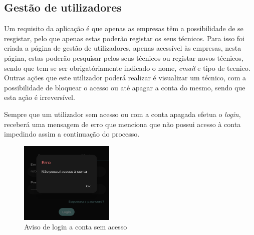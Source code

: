 \subsection{Gestão de utilizadores}
Um requisito da aplicação é que apenas as empresas têm a possibilidade de se resgistar, pelo que apenas estas poderão registar os seus técnicos. Para isso foi criada a página de gestão de utilizadores, apenas acessível às empresas, nesta página, estas poderão pesquisar pelos seus técnicos ou registar novos técnicos, sendo que tem se ser obrigatóriamente indicado o nome, \textit{email} e tipo de tecnico. Outras ações que este utilizador poderá realizar é visualizar um técnico, com a possibilidade de bloquear o acesso ou até apagar a conta do mesmo, sendo que esta ação é irreversível.


\begin{figure}[htb]%
  \centering
  \qquad
  \label{fig:70}%
\end{figure}

Sempre que um utilizador sem acesso ou com a conta apagada efetua o \textit{login}, receberá uma mensagem de erro que menciona que não possui acesso à conta impedindo assim a continuação do processo.

\begin{figure}[htb]
  \centering
  \includegraphics[width=0.4\textwidth]{images/implementacao/frontend/gestao_users/1686054218243.jpg}
  \caption{Aviso de login a conta sem acesso}
  \label{fig:71}
\end{figure}